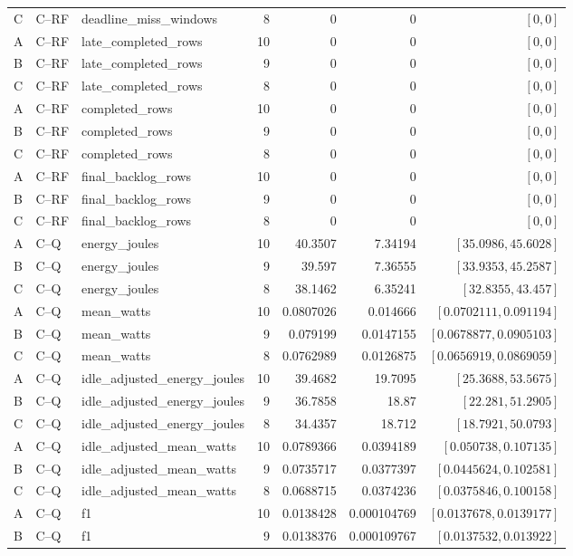 \begin{longtable}{lllrrrr}
C & C--RF & deadline\_miss\_windows & 8 & 0 & 0 & $[0,0]$\\
A & C--RF & late\_completed\_rows & 10 & 0 & 0 & $[0,0]$\\
B & C--RF & late\_completed\_rows & 9 & 0 & 0 & $[0,0]$\\
C & C--RF & late\_completed\_rows & 8 & 0 & 0 & $[0,0]$\\
A & C--RF & completed\_rows & 10 & 0 & 0 & $[0,0]$\\
B & C--RF & completed\_rows & 9 & 0 & 0 & $[0,0]$\\
C & C--RF & completed\_rows & 8 & 0 & 0 & $[0,0]$\\
A & C--RF & final\_backlog\_rows & 10 & 0 & 0 & $[0,0]$\\
B & C--RF & final\_backlog\_rows & 9 & 0 & 0 & $[0,0]$\\
C & C--RF & final\_backlog\_rows & 8 & 0 & 0 & $[0,0]$\\
A & C--Q & energy\_joules & 10 & 40.3507 & 7.34194 & $[35.0986,45.6028]$\\
B & C--Q & energy\_joules & 9 & 39.597 & 7.36555 & $[33.9353,45.2587]$\\
C & C--Q & energy\_joules & 8 & 38.1462 & 6.35241 & $[32.8355,43.457]$\\
A & C--Q & mean\_watts & 10 & 0.0807026 & 0.014666 & $[0.0702111,0.091194]$\\
B & C--Q & mean\_watts & 9 & 0.079199 & 0.0147155 & $[0.0678877,0.0905103]$\\
C & C--Q & mean\_watts & 8 & 0.0762989 & 0.0126875 & $[0.0656919,0.0869059]$\\
A & C--Q & idle\_adjusted\_energy\_joules & 10 & 39.4682 & 19.7095 & $[25.3688,53.5675]$\\
B & C--Q & idle\_adjusted\_energy\_joules & 9 & 36.7858 & 18.87 & $[22.281,51.2905]$\\
C & C--Q & idle\_adjusted\_energy\_joules & 8 & 34.4357 & 18.712 & $[18.7921,50.0793]$\\
A & C--Q & idle\_adjusted\_mean\_watts & 10 & 0.0789366 & 0.0394189 & $[0.050738,0.107135]$\\
B & C--Q & idle\_adjusted\_mean\_watts & 9 & 0.0735717 & 0.0377397 & $[0.0445624,0.102581]$\\
C & C--Q & idle\_adjusted\_mean\_watts & 8 & 0.0688715 & 0.0374236 & $[0.0375846,0.100158]$\\
A & C--Q & f1 & 10 & 0.0138428 & 0.000104769 & $[0.0137678,0.0139177]$\\
B & C--Q & f1 & 9 & 0.0138376 & 0.000109767 & $[0.0137532,0.013922]$\\

\end{longtable}
